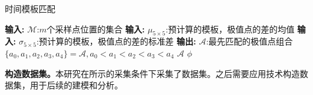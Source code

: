 {{	\begin{breakablealgorithm}
		\caption{时间模板匹配}\label{alg:checkdelta}
		\begin{algorithmic}[1]
			\Statex \textbf{输入:} $\mathcal M$:$m$个采样点位置的集合
			\Statex \textbf{输入:} $\mu_{5\times5}$:预计算的模板，极值点的差的均值
			\Statex \textbf{输入:} $\sigma_{5\times5}$:预计算的模板，极值点的差的标准差
			\Statex \textbf{输出:} $\mathcal A$:最先匹配的极值点组合
			\State $\{a_0,a_1,a_2,a_3,a_4\}=\mathcal A,a_0<a_1<a_2<a_3<a_4$
			\State \Return $\mathcal A$
			\EndIf
			\EndIf
			\EndFor
			\State \Return $\phi$
		\end{algorithmic}
	\end{breakablealgorithm}
	
	
	\textbf{构造数据集。}本研究在所示的采集条件下采集了数据集。之后需要应用\yuchuli 技术构造数据集，用于后续的建模和分析。%
	
}}
